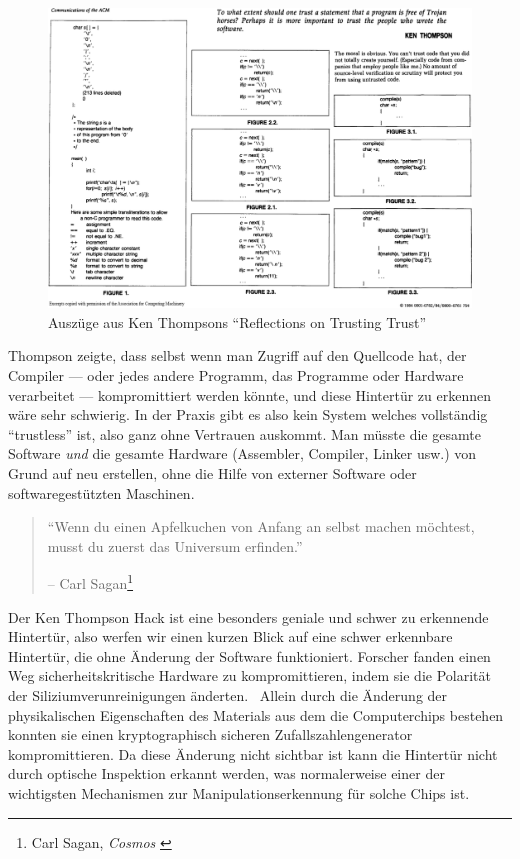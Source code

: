 \begin{figure}
  \includegraphics{assets/images/ken-thompson-hack.png}
  \caption{Auszüge aus Ken Thompsons \enquote{Reflections on Trusting Trust}}
  \label{fig:ken-thompson-hack}
\end{figure}

Thompson zeigte, dass selbst wenn man Zugriff auf den Quellcode hat, der
Compiler --- oder jedes andere Programm, das Programme oder Hardware verarbeitet
--- kompromittiert werden könnte, und diese Hintertür zu erkennen wäre sehr
schwierig. In der Praxis gibt es also kein System welches vollständig
\enquote{trustless} ist, also ganz ohne Vertrauen auskommt. Man müsste die
gesamte Software \textit{und} die gesamte Hardware (Assembler, Compiler, Linker
usw.) von Grund auf neu erstellen, ohne die Hilfe von externer Software oder
softwaregestützten Maschinen.

\begin{quotation}\begin{samepage}
\enquote{Wenn du einen Apfelkuchen von Anfang an selbst machen möchtest, musst
du zuerst das Universum erfinden.}
\begin{flushright} -- Carl Sagan\footnote{Carl Sagan, \textit{Cosmos} \cite{cosmos}}
\end{flushright}\end{samepage}\end{quotation}

Der Ken Thompson Hack ist eine besonders geniale und schwer zu erkennende
Hintertür, also werfen wir einen kurzen Blick auf eine schwer erkennbare
Hintertür, die ohne Änderung der Software funktioniert. Forscher fanden einen
Weg sicherheitskritische Hardware zu kompromittieren, indem sie die Polarität
der Siliziumverunreinigungen änderten.~\cite{becker2013stealthy}  Allein durch
die Änderung der physikalischen Eigenschaften des Materials aus dem die
Computerchips bestehen konnten sie einen kryptographisch sicheren
Zufallszahlengenerator kompromittieren. Da diese Änderung nicht sichtbar ist
kann die Hintertür nicht durch optische Inspektion erkannt werden, was
normalerweise einer der wichtigsten Mechanismen zur Manipulationserkennung für
solche Chips ist.

